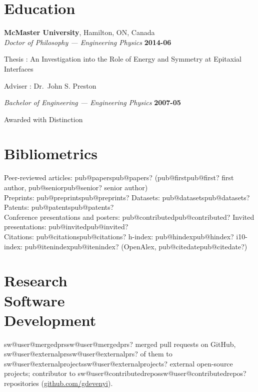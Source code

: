 \documentclass[margin1,line,canadian]{resume}
\makeatletter
\newcommand{\pubstat}[1]{\ifcsname pub@#1\endcsname\csname pub@#1\endcsname\else ?\fi}
\newcommand{\swstat}[2]{\ifcsname sw@#1@#2\endcsname\csname sw@#1@#2\endcsname\else ?\fi}
\makeatother
\begin{document}
\begin{resume}
 \section{\mysidestyle{}Education}
 \textbf{McMaster University}, Hamilton, ON, Canada\\\vspace{2mm}%
 \textsl{Doctor of Philosophy --- Engineering Physics} \hfill \textbf{2014-06}\vspace{-3mm}\\\vspace{-1mm}%
 \begin{list2}
  \item Thesis : An Investigation into the Role of Energy and Symmetry at Epitaxial Interfaces
  \item Adviser : Dr.~John S. Preston
 \end{list2}\vspace{-1.5mm}
 \textsl{Bachelor of Engineering --- Engineering Physics} \hfill \textbf{2007-05}\vspace{-3mm}\\\vspace{-1mm}
 \begin{list2}
  \item Awarded with Distinction
 \end{list2}

 \section{\mysidestyle{}Bibliometrics}
 Peer-reviewed articles: \pubstat{papers} (\pubstat{first} first author, \pubstat{senior} senior author)\\
 Preprints: \pubstat{preprints} \quad Datasets: \pubstat{datasets} \quad Patents: \pubstat{patents}\\
 Conference presentations and posters: \pubstat{contributed} \quad Invited presentations: \pubstat{invited}\\
 Citations: \pubstat{citations} \quad h-index: \pubstat{hindex} \quad i10-index: \pubstat{itenindex}
 (OpenAlex, \pubstat{citedate})

\section{\mysidestyle{}Research\\Software\\Development}
\swstat{user}{mergedprs} merged pull requests on GitHub, \swstat{user}{externalprs} of them to
\swstat{user}{externalprojects} external open-source projects; contributor to \swstat{user}{contributedrepos} repositories
(\href{https://github.com/gdevenyi}{github.com/gdevenyi}).\par\vspace{2mm}


\end{resume}
\end{document}

